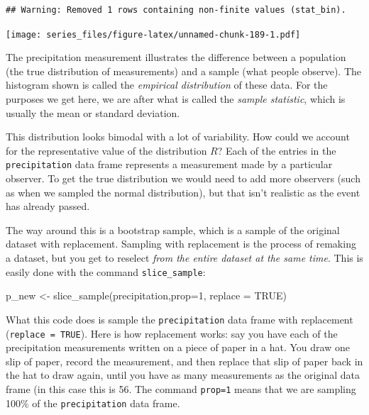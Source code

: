 \documentclass[
]{book}
\newenvironment{Shaded}{\begin{snugshade}}{\end{snugshade}}
\newcommand{\AttributeTok}[1]{\textcolor[rgb]{0.77,0.63,0.00}{#1}}
\newcommand{\ConstantTok}[1]{\textcolor[rgb]{0.00,0.00,0.00}{#1}}
\newcommand{\DecValTok}[1]{\textcolor[rgb]{0.00,0.00,0.81}{#1}}
\newcommand{\FunctionTok}[1]{\textcolor[rgb]{0.00,0.00,0.00}{#1}}
\newcommand{\NormalTok}[1]{#1}
\newcommand{\OtherTok}[1]{\textcolor[rgb]{0.56,0.35,0.01}{#1}}
\theoremstyle{definition}
\theoremstyle{definition}
\theoremstyle{definition}
\theoremstyle{remark}
\begin{document}
\begin{verbatim}
## Warning: Removed 1 rows containing non-finite values (stat_bin).
\end{verbatim}

\texttt{[image: series\_files/figure-latex/unnamed-chunk-189-1.pdf]}

The precipitation measurement illustrates the difference between a population (the true distribution of measurements) and a sample (what people observe). The histogram shown is called the \emph{empirical distribution} of these data. For the purposes we get here, we are after what is called the \emph{sample statistic}, which is usually the mean or standard deviation.

This distribution looks bimodal with a lot of variability. How could we account for the representative value of the distribution \(R\)? Each of the entries in the \texttt{precipitation} data frame represents a measurement made by a particular observer. To get the true distribution we would need to add more observers (such as when we sampled the normal distribution), but that isn't realistic as the event has already passed.

The way around this is a bootstrap sample, which is a sample of the original dataset with replacement. Sampling with replacement is the process of remaking a dataset, but you get to reselect \emph{from the entire dataset at the same time}. This is easily done with the command \texttt{slice\_sample}:

\begin{Shaded}
\begin{Highlighting}[]
\NormalTok{p\_new }\OtherTok{\textless{}{-}} \FunctionTok{slice\_sample}\NormalTok{(precipitation,}\AttributeTok{prop=}\DecValTok{1}\NormalTok{, }\AttributeTok{replace =} \ConstantTok{TRUE}\NormalTok{)}
\end{Highlighting}
\end{Shaded}

What this code does is sample the \texttt{precipitation} data frame with replacement (\texttt{replace\ =\ TRUE}). Here is how replacement works: say you have each of the precipitation measurements written on a piece of paper in a hat. You draw one slip of paper, record the measurement, and then replace that slip of paper back in the hat to draw again, until you have as many measurements as the original data frame (in this case this is 56. The command \texttt{prop=1} means that we are sampling 100\% of the \texttt{precipitation} data frame.
\end{document}
